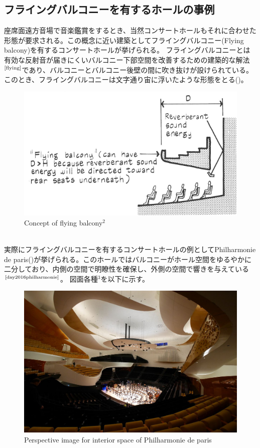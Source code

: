 \subsection{フライングバルコニーを有するホールの事例}
座席面遠方音場で音楽鑑賞をするとき、当然コンサートホールもそれに合わせた形態が要求される。この概念に近い建築としてフライングバルコニー(Flying balcony)を有するコンサートホールが挙げられる。
フライングバルコニーとは有効な反射音が届きにくいバルコニー下部空間を改善するための建築的な解法$^{\text{\cite{flying}}}$であり、バルコニーとバルコニー後壁の間に吹き抜けが設けられている。このとき、フライングバルコニーは文字通り宙に浮いたような形態をとる()。
\begin{figure}[htbp]
    \centering
    \includegraphics[keepaspectratio,scale=1]{01_att/flyingbalcony.pdf}
    \caption{\hspace{1mm}Concept of flying balcony$^2$}
    \label{fig:flyigbalcony}
\end{figure}
\\ 実際にフライングバルコニーを有するコンサートホールの例としてPhilharmonie de paris()が挙げられる。このホールではバルコニーがホール空間をゆるやかに二分しており、内側の空間で明瞭性を確保し、外側の空間で響きを与えている$^{\text{\cite{day2016philharmonie}}}$。
図面各種$^3$を以下に示す。
\begin{figure}[htbp]
    \centering
    \includegraphics[keepaspectratio,scale=0.2]{01_att/pic_in1.png}
    \caption{\hspace{1mm}Perspective image for interior space of Philharmonie de paris}
    \label{fig:pic_in1}
\end{figure}



